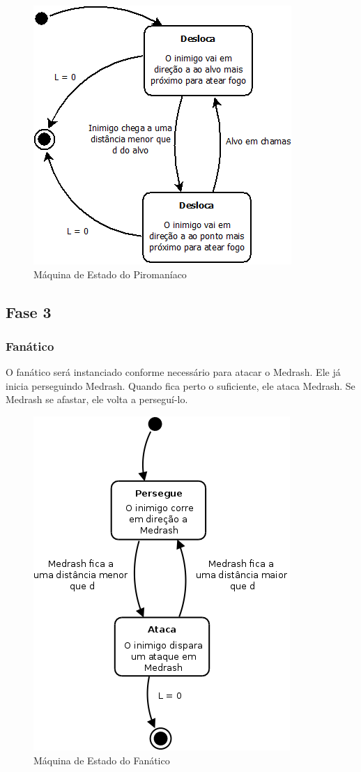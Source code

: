 \begin{figure}[!ht]
 \centering
 \includegraphics[scale=0.5]{ia_piromaniaco.png}
 \caption{Máquina de Estado do Piromaníaco}
 \label{fsm:piromaniaco}
\end{figure}

\subsection{Fase 3}

\subsubsection{Fanático}

O fanático será instanciado conforme necessário para atacar o Medrash.
Ele já inicia perseguindo Medrash. Quando fica perto o suficiente, ele
ataca Medrash. Se Medrash se afastar, ele volta a perseguí-lo.

\begin{figure}[!ht]
 \centering
 \includegraphics[scale=0.5]{ia_fanatico.png}
 \caption{Máquina de Estado do Fanático}
 \label{fsm:guerreiro}
\end{figure}

